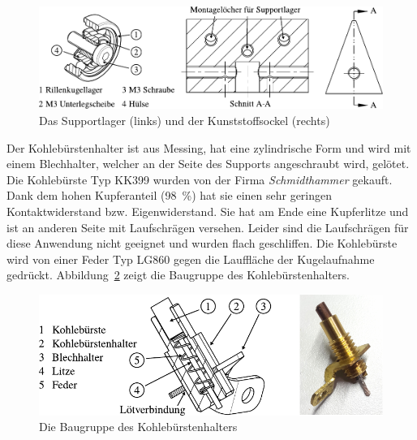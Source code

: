 \begin{figure}[htb]
    \centering
    \includegraphics[]{./images/kugelsupport.pdf}
    \caption{Das Supportlager (links) und der Kunststoffsockel (rechts)}
    \label{fig:das_modifizierte_kugelsupport}
\end{figure}

Der Kohlebürstenhalter ist aus Messing, hat eine zylindrische Form und wird mit einem Blechhalter, welcher an der Seite des Supports angeschraubt wird, gelötet.
Die Kohlebürste Typ KK399 wurden von der Firma \textit{Schmidthammer} gekauft.
Dank dem hohen Kupferanteil (\SI{98}{\percent}) hat sie einen sehr geringen Kontaktwiderstand bzw. Eigenwiderstand.
Sie hat am Ende eine Kupferlitze und ist an anderen Seite mit Laufschrägen versehen.
Leider sind die Laufschrägen für diese Anwendung nicht geeignet und wurden flach geschliffen.
Die Kohlebürste wird von einer Feder Typ LG860 gegen die Lauffläche der Kugelaufnahme gedrückt.
Abbildung~\ref{fig:die_baugruppe_des_kohlebuerstenhalters} zeigt die Baugruppe des Kohlebürstenhalters.

\begin{figure}[htb]
    \centering
    \includegraphics[]{./images/kohlebuerstenhalter_asm.pdf}
    \caption{Die Baugruppe des Kohlebürstenhalters}
    \label{fig:die_baugruppe_des_kohlebuerstenhalters}
\end{figure}

